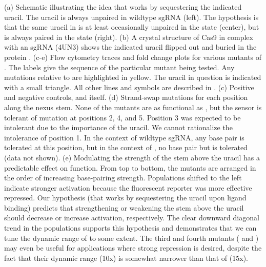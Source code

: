 \documentclass[10pt,oneside]{article}
\begin{document}
    (a) Schematic illustrating the idea that \ligrnaB{} works by sequestering the indicated uracil.  The uracil is always unpaired in wildtype sgRNA (left).  The hypothesis is that the same uracil in \ligrnaB{} is at least occasionally unpaired in the \apo{} state (center), but is always paired in the \holo{} state (right).
    (b) A crystal structure of Cas9 in complex with an sgRNA (4UN3) shows the indicated uracil flipped out and buried in the protein \autocite{nishimasu2014}.
    (c-e) Flow cytometry traces and fold change plots for various mutants of \ligrnaB{}.  The labels give the sequence of the particular mutant being tested.  Any mutations relative to \ligrnaB{} are highlighted in yellow.  The uracil in question is indicated with a small triangle.  All other lines and symbols are described in .
    (c) Positive and negative controls, and \ligrnaB{} itself.
    (d) Strand-swap mutations for each position along the nexus stem.  None of the mutants are as functional as \ligrnaB{}, but the sensor is tolerant of mutation at positions 2, 4, and 5.  Position 3 was expected to be intolerant due to the importance of the uracil.  We cannot rationalize the intolerance of position 1.  In the context of wildtype sgRNA, any base pair is tolerated at this position, but in the context of \ligrnaB{}, no base pair but  is tolerated (data not shown).
    (e) Modulating the strength of the stem above the uracil has a predictable effect on function.  From top to bottom, the mutants are arranged in the order of increasing base-pairing strength.  Populations shifted to the left indicate stronger activation because the fluorescent reporter was more effective repressed.  Our hypothesis (that \ligrnaB{} works by sequestering the uracil upon ligand binding) predicts that strengthening or weakening the stem above the uracil should decrease or increase activation, respectively.  The clear downward diagonal trend in the populations supports this hypothesis and demonstrates that we can tune the dynamic range of \ligrnaB{} to some extent.  The third and fourth mutants ( and ) may even be useful for applications where strong repression is desired, despite the fact that their dynamic range (10x) is somewhat narrower than that of \ligrnaB{} (15x).


\end{document}
